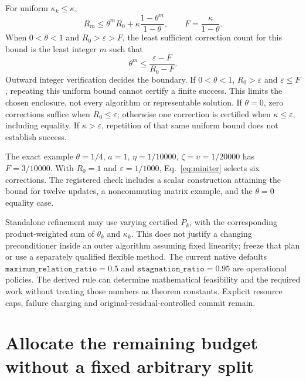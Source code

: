 \documentclass[aps,pra,reprint,onecolumn,10pt,notitlepage,nofootinbib]{revtex4-2}
\newcommand{\eps}{\varepsilon}
\begin{document}
For uniform $\kappa_k\le\kappa$,
\begin{equation}
 R_m\le\theta^mR_0+
       \kappa\frac{1-\theta^m}{1-\theta},\qquad
 F=\frac{\kappa}{1-\theta}.                                 \label{eq:floor}
\end{equation}
When $0<\theta<1$ and $R_0>\eps>F$, the least sufficient correction count
for this bound is the least integer $m$ such that
\begin{equation}
 \theta^m\le\frac{\eps-F}{R_0-F}.                           \label{eq:miniter}
\end{equation}
Outward integer verification decides the boundary. If $0<\theta<1$,
$R_0>\eps$ and $\eps\le F$, repeating this uniform bound cannot certify
a finite success. This limits the chosen enclosure, not every algorithm or
representable solution. If $\theta=0$, zero corrections suffice when
$R_0\le\eps$; otherwise one correction is certified when $\kappa\le\eps$,
including equality. If $\kappa>\eps$, repetition of that same uniform bound
does not establish success.

The exact example $\theta=1/4$, $a=1$, $\eta=1/10000$,
$\zeta=\upsilon=1/20000$ has $F=3/10000$. With $R_0=1$ and
$\eps=1/1000$, Eq.~\eqref{eq:miniter} selects six corrections. The registered
check includes a scalar construction attaining the bound for twelve updates,
a noncommuting matrix example, and the $\theta=0$ equality case.

Standalone refinement may use varying certified $P_k$, with the corresponding
product-weighted sum of $\theta_k$ and $\kappa_k$. This does not justify a
changing preconditioner inside an outer algorithm assuming fixed linearity;
freeze that plan or use a separately qualified flexible method. The current
native defaults $\texttt{maximum\_relation\_ratio}=0.5$ and
$\texttt{stagnation\_ratio}=0.95$ are operational policies. The derived rule
can determine mathematical feasibility and the required work without treating
those numbers as theorem constants. Explicit resource caps, failure charging
and original-residual-controlled commit remain.

\section{Allocate the remaining budget without a fixed arbitrary split}
\end{document}
